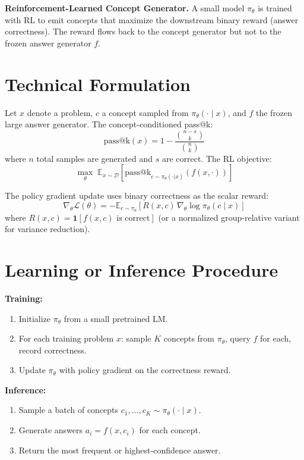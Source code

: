 \documentclass[10pt,twocolumn]{article}
\begin{document}
\textbf{Reinforcement-Learned Concept Generator.} A small model $\pi_\theta$
is trained with RL to emit concepts that maximize the downstream binary
reward (answer correctness). The reward flows back to the concept generator
but not to the frozen answer generator $f$.

\section{Technical Formulation}

Let $x$ denote a problem, $c$ a concept sampled from $\pi_\theta(\cdot \mid x)$,
and $f$ the frozen large answer generator. The concept-conditioned pass@k:
\[
\text{pass@k}(x) = 1 - \frac{\binom{n-s}{k}}{\binom{n}{k}}
\]
where $n$ total samples are generated and $s$ are correct. The RL objective:
\[
\max_\theta \;\mathbb{E}_{x \sim \mathcal{D}}\!\left[
  \text{pass@k}_{c \sim \pi_\theta(\cdot|x)}(f(x, \cdot))
\right]
\]

The policy gradient update uses binary correctness as the scalar reward:
\[
\nabla_\theta \mathcal{L}(\theta) = -\mathbb{E}_{c \sim \pi_\theta}\!\left[
  R(x, c) \, \nabla_\theta \log \pi_\theta(c \mid x)
\right]
\]
where $R(x, c) = \mathbf{1}[f(x,c) \text{ is correct}]$ (or a normalized
group-relative variant for variance reduction).

\section{Learning or Inference Procedure}

\textbf{Training:}
\begin{enumerate}[itemsep=2pt,parsep=0pt]
  \item Initialize $\pi_\theta$ from a small pretrained LM.
  \item For each training problem $x$: sample $K$ concepts from $\pi_\theta$,
    query $f$ for each, record correctness.
  \item Update $\pi_\theta$ with policy gradient on the correctness reward.
\end{enumerate}

\textbf{Inference:}
\begin{enumerate}[itemsep=2pt,parsep=0pt]
  \item Sample a batch of concepts $c_1,\ldots,c_K \sim \pi_\theta(\cdot \mid x)$.
  \item Generate answers $a_i = f(x, c_i)$ for each concept.
  \item Return the most frequent or highest-confidence answer.
\end{enumerate}
\end{document}
